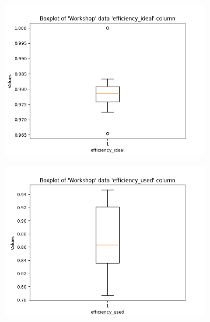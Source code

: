 \begin{figure}[H]
    \centering
    \begin{subfigure}[b]{0.45\textwidth}
        \centering
        \includegraphics[width=\textwidth]{Images/Workshop_efficiency_ideal_Boxplot.png}
        \caption{}
    \end{subfigure}
    \hfill
    \begin{subfigure}[b]{0.45\textwidth}
        \centering
        \includegraphics[width=\textwidth]{Images/Workshop_efficiency_used_Boxplot.png}
        \caption{}
    \end{subfigure}
    \caption{}
\end{figure}

